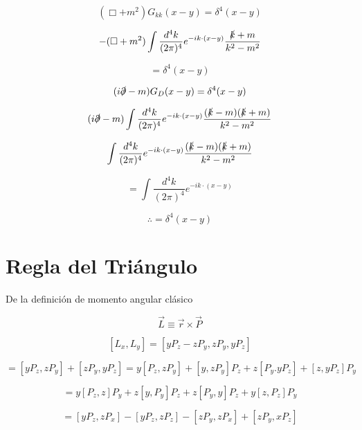 \documentclass{report}
\begin{document}
\begin{itemize}
{{\[\dot{\vec{r}} = - i [H_D , \vec{r} ] = - i [\vec{\alpha } \cdot \vec{p} + \beta m_{1} \vec{r} ] \] 

\[= - i \alpha ^j [p^j . \vec{r} ] = \vec{\alpha }\] 

\[\therefore p^j = - i \partial ^j = + i \partial _j \] 

\item 3)

\[(\frac{\slashed{p}+m}{p^2 - m^2 }) (\slashed{p}-m ) \quad \text{con} \slashed{p} \slashed{p} = p^2 \] 

\[= \frac{p^2 - m^2 }{p^2 - m^2 } = 1 \] 

\item 4)
\end{itemize}

\[(\Box + m^2 ) G_{kk} (x-y) = \delta ^4 (x-y)\] 

\[-(\Box + m^2 ) \int \frac{d^4 k}{(2 \pi )^4 } e^{-ik\cdot (x-y)} \frac{\slashed{k}+m}{k^2 - m^2 }\] 

\[= \delta^4 (x-y)\] 

\[(i \slashed{\partial} - m ) G_{D} (x-y) = \delta^{4} (x-y)\] 

\[(i \slashed{\partial} - m) \int \frac{d^4 k}{(2 \pi)^4 } e^{-ik \cdot (x-y)} \frac{(\slashed{k} - m) (\slashed{k}+m)}{k^2 - m^2 } \] 

\[\int \frac{d^4 k}{(2 \pi)^4 } e^{-ik \cdot (x-y)} \frac{(\slashed{k}-m)(\slashed{k}+m)}{k^2 - m^2 }\] 

\[= \int \frac{d^4 k}{(2 \pi)^4 } e^{-ik \cdot (x-y)}\] 

\[\therefore = \delta^{4}(x-y)\] 


\section{Regla del Tri\'angulo}

De la definici\'on de momento angular cl\'asico

\[\overrightarrow{L} \equiv \overrightarrow{r} \times \overrightarrow{P}\]

\[[L_x ,L_y] = [yP_z -zP_y , zP_y , yP_z]\]

\[= [y P_z, zP_y] + [zP_y, yP_z] = y[P_z, zP_y ] + [y, z P_y]P_z + z[P_y . y P_z ] + [z, yP_z ]P_y  \]

\[=y[P_z , z] P_y + z [y, P_y] P_z + z[P_y , y] P_z + y[z, P_z ] P_y\]

\[= [yP_z , zP_x ] - [yP_z , zP_z ]- [zP_y , zP_x] + [zP_y , xP_z ] \]
\end{document}
